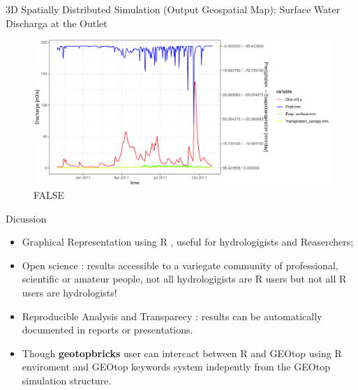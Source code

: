 \documentclass[ignorenonframetext,]{beamer}
\providecommand{\tightlist}{%
  \setlength{\itemsep}{0pt}\setlength{\parskip}{0pt}}
\begin{document}
\begin{frame}{3D Spatially Distributed Simulation (Output Geospatial
Map): Surface Water Discharga at the Outlet}

\begin{figure}
\centering
\includegraphics{presentation_files/figure-beamer/unnamed-chunk-18-1.pdf}
\caption{FALSE}
\end{figure}

\end{frame}

\begin{frame}{Dicussion}

\begin{itemize}
\tightlist
\item
  Graphical Representation using R , useful for hydrologigists and
  Reaserchers;
\item
  Open science : results accessible to a variegate community of
  professional, scientific or amateur people, not all hydrologigists are
  R users but not all R users are hydrologists!
\item
  Reproducible Analysis and Transparecy : results can be automatically
  documented in reports or presentations.
\item
  Though \textbf{geotopbricks} user can intercact between R and GEOtop
  using R enviroment and GEOtop keywords system indepently from the
  GEOtop simulation structure.
\end{itemize}

\end{frame}
\end{document}
